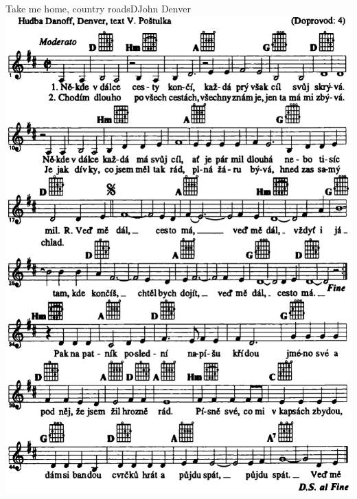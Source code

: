 \setcounter{page}{126}
\begin{song}{Take me home, country roads}{D}{John Denver}
\includegraphics[width=\textwidth]{noty/c_take-me-home-country-roads} \end{song} \pagebreak
